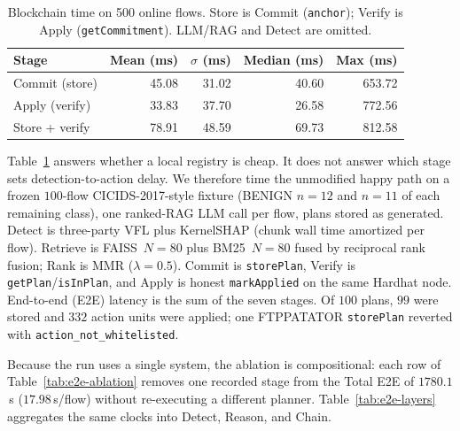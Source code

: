 \documentclass[10pt, conference]{IEEEtran}
\begin{document}
\begin{table}[t]
\centering
\caption{Blockchain time on 500 online flows. Store is Commit (\texttt{anchor}); Verify is Apply (\texttt{getCommitment}). LLM/RAG and Detect are omitted.}
\label{tab:latency}
\renewcommand{\arraystretch}{1.15}
\begin{tabular}{@{}lrrrr@{}}
\toprule
\textbf{Stage} & \textbf{Mean (ms)} & \textbf{$\sigma$ (ms)} & \textbf{Median (ms)} & \textbf{Max (ms)}\\
\midrule
Commit (store)   & 45.08 & 31.02 & 40.60 & 653.72\\
Apply (verify)   & 33.83 & 37.70 & 26.58 & 772.56\\
Store + verify   & 78.91 & 48.59 & 69.73 & 812.58\\
\bottomrule
\end{tabular}
\end{table}

Table~\ref{tab:latency} answers whether a local registry is cheap. It does not answer which stage sets detection-to-action delay. We therefore time the unmodified happy path on a frozen $100$-flow CICIDS-2017-style fixture (BENIGN $n{=}12$ and $n{=}11$ of each remaining class), one ranked-RAG LLM call per flow, plans stored as generated. Detect is three-party VFL plus KernelSHAP (chunk wall time amortized per flow). Retrieve is FAISS~$N{=}80$ plus BM25~$N{=}80$ fused by reciprocal rank fusion; Rank is MMR ($\lambda{=}0.5$). Commit is \texttt{storePlan}, Verify is \texttt{getPlan}/\texttt{isInPlan}, and Apply is honest \texttt{markApplied} on the same Hardhat node. End-to-end (E2E) latency is the sum of the seven stages. Of $100$ plans, $99$ were stored and $332$ action units were applied; one FTPPATATOR \texttt{storePlan} reverted with \texttt{action\_not\_whitelisted}.

Because the run uses a single system, the ablation is compositional: each row of Table~\ref{tab:e2e-ablation} removes one recorded stage from the Total E2E of $1780.1$\,s ($17.98$\,s/flow) without re-executing a different planner. Table~\ref{tab:e2e-layers} aggregates the same clocks into Detect, Reason, and Chain.
\end{document}
